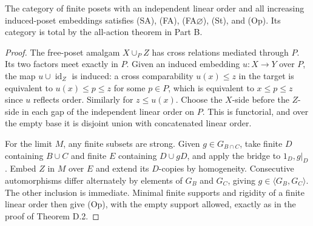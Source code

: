 \begin{corollary}
The category of finite posets with an independent linear order and all
increasing induced-poset embeddings satisfies (SA), (FA), (FA$\varnothing$),
(St), and (Op). Its category is total by the all-action theorem in Part B.
\end{corollary}
\begin{proof}
The free-poset amalgam $X\cup_P Z$ has cross relations mediated through
$P$. Its two factors meet exactly in $P$. Given an induced embedding
$u:X\to Y$ over $P$, the map $u\cup\operatorname{id}_Z$ is induced:
a cross comparability $u(x)\leq z$ in the target is equivalent to
$u(x)\leq p\leq z$ for some $p\in P$, which is equivalent to
$x\leq p\leq z$ since $u$ reflects order. Similarly for $z\leq u(x)$.
Choose the $X$-side before the $Z$-side in each gap of the independent
linear order on $P$. This is functorial, and over the empty base it is
disjoint union with concatenated linear order.

For the limit $M$, any finite subsets are strong. Given
$g\in G_{B\cap C}$, take finite $D$ containing $B\cup C$ and finite
$E$ containing $D\cup gD$, and apply the bridge to $1_D,g|_D$.
Embed $Z$ in $M$ over $E$ and extend its $D$-copies by homogeneity.
Consecutive automorphisms differ alternately by elements of $G_B$
and $G_C$, giving $g\in\langle G_B,G_C\rangle$. The other inclusion
is immediate. Minimal finite supports and rigidity of a finite
linear order then give (Op), with the empty support allowed, exactly
as in the proof of Theorem D.2.
\end{proof}
